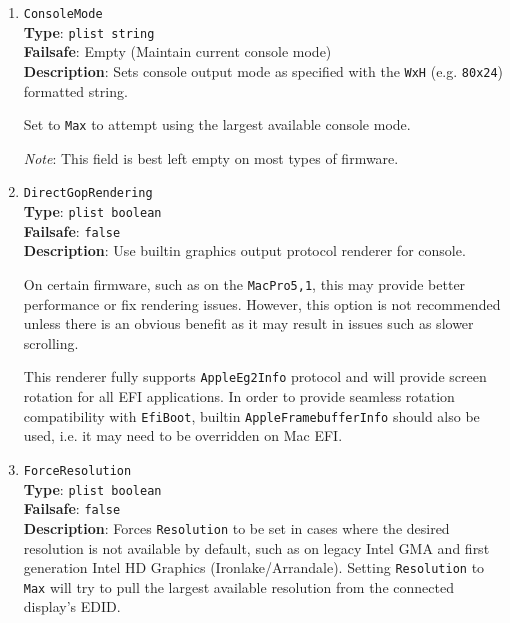\documentclass[]{article}
\begin{document}
\begin{enumerate}
  \emph{Note 1}: On many newer systems the \texttt{System} text renderer already provides a full
  set of international characters, in which case this can be used without requiring the \texttt{Builtin}
  renderer and a custom font.

  \emph{Note 2}: This option only affects the \texttt{Builtin} text renderer and only takes effect from
  the point at which the \texttt{Builtin} renderer is configured. When console output is visible before
  this point, it is using the system console font.

\item
  \texttt{ConsoleMode}\\
  \textbf{Type}: \texttt{plist\ string}\\
  \textbf{Failsafe}: Empty (Maintain current console mode)\\
  \textbf{Description}: Sets console output mode as specified
  with the \texttt{WxH} (e.g. \texttt{80x24}) formatted string.

  Set to \texttt{Max} to attempt using the largest available console mode.

  \emph{Note}: This field is best left empty on most types of firmware.

\item
  \texttt{DirectGopRendering}\\
  \textbf{Type}: \texttt{plist\ boolean}\\
  \textbf{Failsafe}: \texttt{false}\\
  \textbf{Description}: Use builtin graphics output protocol renderer for console.

  On certain firmware, such as on the \texttt{MacPro5,1}, this may provide better
  performance or fix rendering issues. However, this option is not recommended unless
  there is an obvious benefit as it may result in issues such as slower scrolling.

  This renderer fully supports \texttt{AppleEg2Info} protocol and will provide
  screen rotation for all EFI applications. In order to provide seamless rotation
  compatibility with \texttt{EfiBoot}, builtin \texttt{AppleFramebufferInfo} should
  also be used, i.e. it may need to be overridden on Mac EFI.

\item
  \texttt{ForceResolution}\\
  \textbf{Type}: \texttt{plist\ boolean}\\
  \textbf{Failsafe}: \texttt{false}\\
  \textbf{Description}: Forces \texttt{Resolution} to be set in cases where the desired
  resolution is not available by default, such as on legacy Intel GMA and first
  generation Intel HD Graphics (Ironlake/Arrandale). Setting \texttt{Resolution} to
  \texttt{Max} will try to pull the largest available resolution from the connected
  display's EDID.


\end{enumerate}
\end{document}
